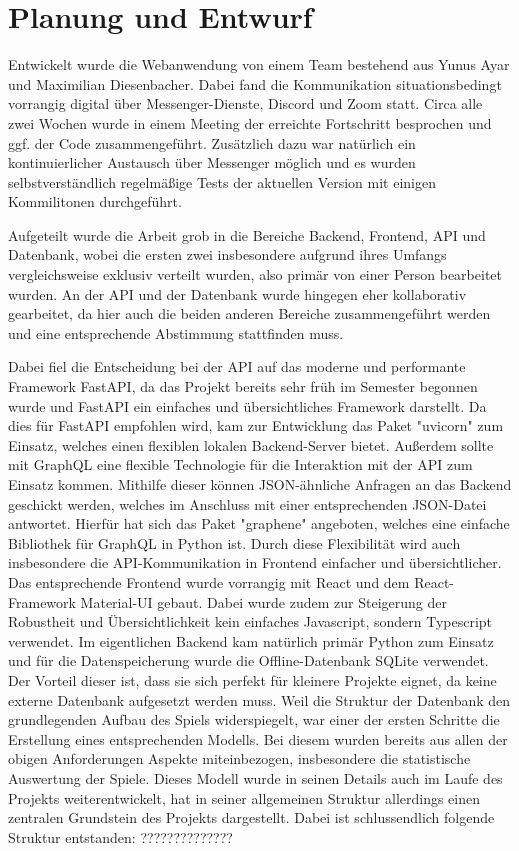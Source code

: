 \section{Planung und Entwurf}

Entwickelt wurde die Webanwendung von einem Team bestehend aus Yunus Ayar und Maximilian Diesenbacher. Dabei fand die Kommunikation situationsbedingt vorrangig digital über Messenger-Dienste, Discord und Zoom statt. Circa alle zwei Wochen wurde in einem Meeting der erreichte Fortschritt besprochen und ggf. der Code zusammengeführt. Zusätzlich dazu war natürlich ein kontinuierlicher Austausch über Messenger möglich und es wurden selbstverständlich regelmäßige Tests der aktuellen Version mit einigen Kommilitonen durchgeführt.

Aufgeteilt wurde die Arbeit grob in die Bereiche Backend, Frontend, API und Datenbank, wobei die ersten zwei insbesondere aufgrund ihres Umfangs vergleichsweise exklusiv verteilt wurden, also primär von einer Person bearbeitet wurden. An der API und der Datenbank wurde hingegen eher kollaborativ gearbeitet, da hier auch die beiden anderen Bereiche zusammengeführt werden und eine entsprechende Abstimmung stattfinden muss.

Dabei fiel die Entscheidung bei der API auf das moderne und performante Framework FastAPI, da das Projekt bereits sehr früh im Semester begonnen wurde und FastAPI ein einfaches und übersichtliches Framework darstellt. Da dies für FastAPI empfohlen wird, kam zur Entwicklung das Paket "uvicorn" zum Einsatz, welches einen flexiblen lokalen Backend-Server bietet. Außerdem sollte mit GraphQL eine flexible Technologie für die Interaktion mit der API zum Einsatz kommen. Mithilfe dieser können JSON-ähnliche Anfragen an das Backend geschickt werden, welches im Anschluss mit einer entsprechenden JSON-Datei antwortet. Hierfür hat sich das Paket "graphene" angeboten, welches eine einfache Bibliothek für GraphQL in Python ist. Durch diese Flexibilität wird auch insbesondere die API-Kommunikation in Frontend einfacher und übersichtlicher. Das entsprechende Frontend wurde vorrangig mit React und dem React-Framework Material-UI gebaut. Dabei wurde zudem zur Steigerung der Robustheit und Übersichtlichkeit kein einfaches Javascript, sondern Typescript verwendet. Im eigentlichen Backend kam natürlich primär Python zum Einsatz und für die Datenspeicherung wurde die Offline-Datenbank SQLite verwendet. Der Vorteil dieser ist, dass sie sich perfekt für kleinere Projekte eignet, da keine externe Datenbank aufgesetzt werden muss. Weil die Struktur der Datenbank den grundlegenden Aufbau des Spiels widerspiegelt, war einer der ersten Schritte die Erstellung eines entsprechenden Modells. Bei diesem wurden bereits aus allen der obigen Anforderungen Aspekte miteinbezogen, insbesondere die statistische Auswertung der Spiele. Dieses Modell wurde in seinen Details auch im Laufe des Projekts weiterentwickelt, hat in seiner allgemeinen Struktur allerdings einen zentralen Grundstein des Projekts dargestellt. Dabei ist schlussendlich folgende Struktur entstanden: ??????????????

